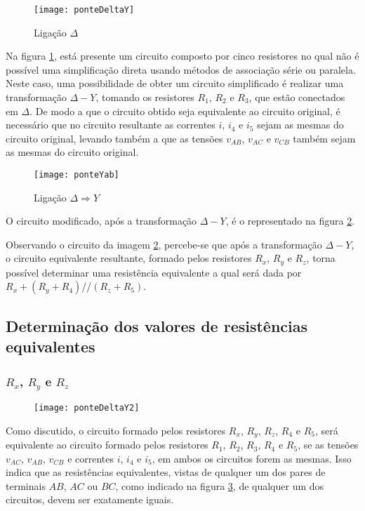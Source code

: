 \documentclass[12pt,fleqn]{book} %
\begin{document}
 \begin{figure}[!htbp] \centering\texttt{[image: ponteDeltaY]}
            \caption{Ligação $\Delta$}\label{ponteDeltaY} 
        \end{figure}
        
Na figura \ref{ponteDeltaY}, está presente um circuito composto por cinco resistores no qual não é possível uma simplificação direta usando métodos de associação série ou paralela. Neste caso, uma possibilidade de obter um circuito simplificado é realizar uma transformação $\Delta - Y$, tomando os resistores $R_1$, $R_2$ e $R_3$, que estão conectados em $\Delta$. De modo a que o circuito obtido seja equivalente ao circuito original, é necessário que no circuito resultante as correntes $i$, $i_4$ e $i_5$ sejam as mesmas do circuito original, levando também a que as tensões $v_{AB}$, $v_{AC}$ e $v_{CB}$ também sejam as mesmas do circuito original.

 \begin{figure}[!htbp] \centering\texttt{[image: ponteYab]}
            \caption{Ligação $\Delta \Rightarrow Y$}\label{ponteYab} 
        \end{figure}

O circuito modificado, após a transformação $\Delta - Y$, é o representado na figura \ref{ponteYab}.

Observando o circuito da imagem \ref{ponteYab}, percebe-se que após a transformação $\Delta - Y$, o circuito equivalente resultante, formado pelos resistores $R_x$, $R_y$ e $R_z$, torna possível determinar uma resistência equivalente a qual será dada por $R_x+(R_y +R_4)$//$(R_z+R_5)$.

 
    \subsection{Determinação dos valores de resistências equivalentes}
        \subsubsection{$R_x$, $R_y$ e $R_z$}

        \begin{figure}[!htbp] \centering\texttt{[image: ponteDeltaY2]}
            \caption{}\label{ponteDeltaY2} 
        \end{figure}

Como discutido, o circuito formado pelos resistores $R_x$, $R_y$, $R_z$, $R_4$ e $R_5$, será equivalente ao circuito formado pelos resistores $R_1$, $R_2$, $R_3$, $R_4$ e $R_5$, se as tensões $v_{AC}$, $v_{AB}$, $v_{CB}$ e correntes $i$, $i_4$ e $i_5$, em ambos os circuitos forem as mesmas. Isso indica que as resistências equivalentes, vistas de qualquer um dos pares de terminais $AB$, $AC$ ou $BC$, como indicado na figura \ref{ponteDeltaY2}, de qualquer um dos circuitos, devem ser exatamente iguais.
\end{document}
